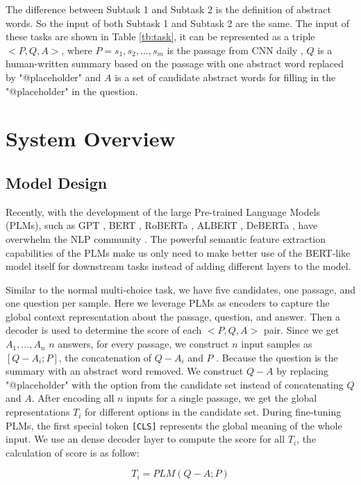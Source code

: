 \documentclass[11pt,a4paper]{article}
\begin{document}
The difference between Subtask 1 and Subtask 2 is the definition of abstract words.
So the input of both Subtask 1 and Subtask 2 are the same.
The input of these tasks are shown in Table \ref{tb:task}, it can be represented as a triple $<P,Q,A>$, where $P=s_1,s_2,...,s_m$ is the passage from CNN daily  \cite{hermann_teaching_2015}, $Q$ is a human-written summary based on the passage with one abstract word replaced by "@placeholder" and $A$ is a set of candidate abstract words for filling in the "@placeholder" in the question. 

\section{System Overview}
\label{sect:system-overview}
\subsection{Model Design}

Recently, with the development of the large Pre-trained Language Models (PLMs), such as GPT \cite{gpt}, BERT  \cite{devlin_bert_2019}, RoBERTa \cite{roberta}, ALBERT \cite{lan_albert_2020}, DeBERTa \cite{he_deberta_2021}, have overwhelm the NLP community \cite{zhang2020conceptualized}.
The powerful semantic feature extraction capabilities of the PLMs make us only need to make better use of the BERT-like model itself for downstream tasks instead of adding different layers to the model. 

Similar to the normal multi-choice task, we have five candidates, one passage, and one question per sample.
Here we leverage PLMs as encoders to capture the global context representation about the passage, question, and answer.
Then a decoder is used to determine the score of each  $<P,Q,A>$ pair. 
Since we get ${A_1,...,A_n}$ $n$ answers, for every passage, we construct $n$ input samples as $[Q-A_i;P]$, the concatenation of $Q-A_i$ and $P$ .
Because the question is the summary with an abstract word removed.
We construct $Q-A$ by replacing "@placeholder" with the option from the candidate set instead of concatenating $Q$ and $A$.
After encoding all $n$ inputs for a single passage, we get the global representations $T_i$ for different options in the candidate set.
During fine-tuning PLMs,  the first special token \texttt{[CLS]} represents the global meaning of the whole input.
We use an dense decoder layer to compute the score for all $T_i$, the calculation of score is as follow:

\begin{equation}
    T_{i}= PLM( Q-A;P )
\end{equation}
\end{document}
